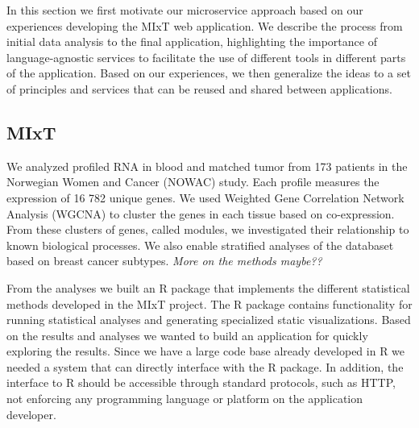 In this section we first motivate our microservice approach based on our
experiences developing the MIxT web application.
We describe the process from initial data analysis to the final application,
highlighting the importance
of language-agnostic services to facilitate the use of different tools in
different parts of the application. 
Based on our experiences, we then generalize the ideas to a set
of principles and services that can be reused and shared between applications. 




\subsection*{MIxT} 
We analyzed profiled RNA in blood and matched tumor from 173 patients in the
Norwegian Women and Cancer (NOWAC) study. Each profile measures the expression
of 16 782 unique genes. We used Weighted Gene Correlation Network Analysis
(WGCNA)\cite{langfelder2008wgcna} to cluster the genes in each tissue
based on co-expression. From these clusters of genes, called modules, we
investigated their relationship to known biological processes. We also enable
stratified analyses of the databaset based on breast cancer subtypes. 
\emph{More on the methods maybe??}

From the analyses we built an R package\cite{mixt-r-package} that
implements the different statistical methods developed in the MIxT project. 
The R package contains functionality for running statistical analyses and
generating specialized static visualizations. Based on the results and analyses
we wanted to build an application for quickly exploring the results. Since we
have a large code base already developed in R we needed a system that can
directly interface with the R package. 
In addition, the interface to R should be accessible through standard protocols,
such as HTTP, not enforcing any programming language or platform on the
application developer. 

